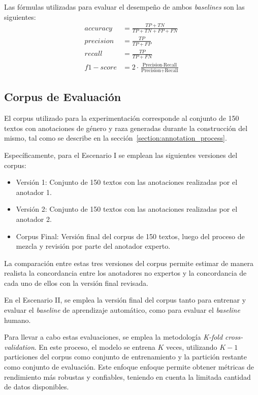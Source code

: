 
Las f\'ormulas utilizadas para evaluar el desempe\~no de ambos \emph{baselines} son las siguientes:
\begin{align*}
    accuracy &= \frac{TP + TN}{TP + TN + FP + FN}\\
    precision &= \frac{TP}{TP + FP}\\
    recall &= \frac{TP}{TP + FN}\\
    f1-score &= 2 \cdot \frac{\text{Precision} \cdot \text{Recall}}{\text{Precision} + \text{Recall}}
\end{align*}


\subsection{Corpus de Evaluaci\'on}
El corpus utilizado para la experimentaci\'on corresponde al conjunto de 150 textos con anotaciones de g\'enero y raza
generadas durante la construcci\'on del mismo, tal como se describe en la secci\'on~\ref{section:annotation_process}.

Espec\'ificamente, para el Escenario I se emplean las siguientes versiones del corpus:
\begin{itemize}
    \item Versi\'on 1: Conjunto de 150 textos con las anotaciones realizadas por el anotador 1.
    \item Versi\'on 2: Conjunto de 150 textos con las anotaciones realizadas por el anotador 2.
    \item Corpus Final: Versi\'on final del corpus de 150 textos, luego del proceso de mezcla y revisi\'on por parte 
    del anotador experto.
\end{itemize}

La comparaci\'on entre estas tres versiones del corpus permite estimar de manera realista la concordancia entre los anotadores 
no expertos y la concordancia de cada uno de ellos con la versi\'on final revisada. 

En el Escenario II, se emplea la versi\'on final del corpus tanto para entrenar y evaluar el \emph{baseline} de aprendizaje 
autom\'atico, como para evaluar el \emph{baseline} humano.

Para llevar a cabo estas evaluaciones, se emplea la 
metodolog\'ia \emph{K-fold cross-validation}. En este proceso, el modelo se entrena $K$ veces, utilizando 
$K-1$ particiones del corpus como conjunto de entrenamiento y la partici\'on restante como conjunto de evaluaci\'on.
Este enfoque enfoque permite obtener m\'etricas de rendimiento m\'as robustas y confiables, teniendo en cuenta 
la limitada cantidad de datos disponibles.


